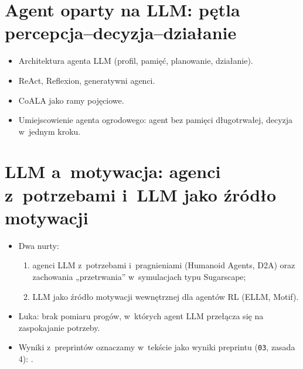 \section{Agent oparty na LLM: pętla percepcja–decyzja–działanie}
\label{sec:2-3}

\begin{planroboczy}[ok. 2 s.]
\begin{itemize}
  \item Architektura agenta LLM (profil, pamięć, planowanie, działanie).
  \item ReAct, Reflexion, generatywni agenci.
  \item CoALA jako ramy pojęciowe.
  \item Umiejscowienie agenta ogrodowego: agent bez pamięci długotrwałej, decyzja w~jednym kroku.
\end{itemize}

\end{planroboczy}

\section{LLM a~motywacja: agenci z~potrzebami i~LLM jako źródło motywacji}
\label{sec:2-4}

\begin{planroboczy}[ok. 2 s.]
\begin{itemize}
  \item Dwa nurty:
  \begin{enumerate}
    \item agenci LLM z~potrzebami i~pragnieniami (Humanoid Agents, D2A) oraz zachowania „przetrwania” w~symulacjach typu Sugarscape;
    \item LLM jako źródło motywacji wewnętrznej dla agentów RL (ELLM, Motif).
  \end{enumerate}
  \item Luka: brak pomiaru progów, w~których agent LLM przełącza się na zaspokajanie potrzeby.
  \item Wyniki z~preprintów oznaczamy w~tekście jako wyniki preprintu (\texttt{03}, zasada 4): \cite{masumori2025survival}.
\end{itemize}

\end{planroboczy}

